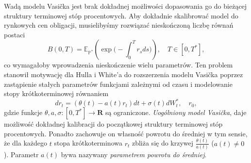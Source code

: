 \documentclass{mini}
\theoremstyle{mythstyle}
\begin{document}
	Wadą modelu Vasi\v{c}ka jest brak dokładnej możliwości dopasowania go do bieżącej struktury terminowej stóp procentowych. Aby dokładnie skalibrować model do rynkowych cen obligacji, musielibyśmy rozwiązać nieskończoną liczbę równań postaci
	\begin{equation}
	B(0,T) = \mathbb{E}_{\mathbb{P}^*}
	\left(\exp\bigg(-\int_0^T r_sds\bigg)\right), \quad T \in [0,T^*], 
	\end{equation}
	co wymagałoby wprowadzenia nieskończenie wielu parametrów. Ten problem stanowił motywację dla Hulla i White'a do rozszerzenia modelu Vasi\v{c}ka poprzez zastąpienie stałych parametrów funkcjami zależnymi od czasu i modelowanie stopy krótkoterminowej równaniem
	\begin{equation}
	dr_t =(\theta(t) -a(t)r_t)dt+\sigma(t) dW_t^*, \quad r_0,
	\end{equation}
	gdzie funkcje $\theta,a,\sigma: [0,T^*] \to \mathbf{R}$ są ograniczone. \textit{Uogólniony model Vasi\v{c}ka}, daje możliwość dokładnej kalibracji do początkowej struktury terminowej stóp procentowych. Ponadto zachowuje on własność powrotu do średniej w tym sensie, że dla każdego $t$ stopa krótkoterminowa $r_t$ zbliża się do krzywej $\frac{\theta(t)}{a(t)}$ ($a(t) \neq 0$). Parametr $a(t)$ bywa nazywany \textit{parametrem powrotu do średniej}.
\end{document}

